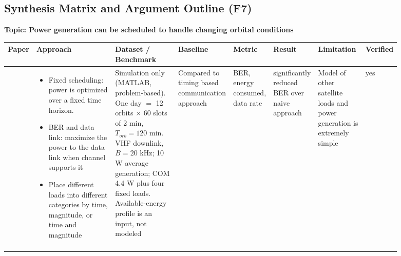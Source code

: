 \subsection{Synthesis Matrix and Argument Outline (F7)}

\textbf{Topic: Power generation can be scheduled to handle changing orbital conditions }

{\footnotesize\setlength{\tabcolsep}{3pt}
\begin{longtable}{@{}p{0.06\linewidth}p{0.20\linewidth}p{0.16\linewidth}p{0.10\linewidth}p{0.09\linewidth}p{0.11\linewidth}p{0.12\linewidth}p{0.05\linewidth}@{}}
  \toprule
    Paper & Approach & Dataset / Benchmark & Baseline & Metric & Result & Limitation & Verified \\
  \midrule
  \endhead
    \cite{husseinOptimizedLoadSchedulingAlgorithm2023} & 
    \begin{minipage}[t]{\linewidth}
    \begin{itemize}[nosep, left-margin=1em]
        \item Fixed scheduling: power is optimized over a fixed time horizon.
        \item BER and data link: maximize the power to the data link when channel supports it
        \item Place different loads into different categories by time, magnitude, or time and magnitude\strut
    \end{itemize}
    \end{minipage} &
    Simulation only (MATLAB, problem-based). One day $=$ 12 orbits $\times$ 60 slots of 2 min, $T_{orb} = 120$ min. VHF downlink, $B = 20$ kHz; 10 W average generation; COM 4.4 W plus four fixed loads. Available-energy profile is an input, not modeled &
    Compared to timing based communication approach &
    BER, energy consumed, data rate&
    significantly reduced BER over naive approach &
    Model of other satellite loads and power generation is extremely simple & 
    yes \\
    \addlinespace


\end{longtable}}
